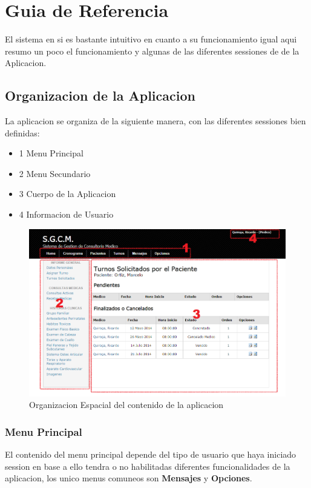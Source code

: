 \chapter{Guia de Referencia}

El sistema en si es bastante intuitivo en cuanto a su funcionamiento igual aqui
resumo un poco el funcionamiento y algunas de las diferentes
sessiones de de la Aplicacion.

\section{Organizacion de la Aplicacion}

La aplicacion se organiza de la siguiente manera, con las diferentes sessiones
bien definidas:

\begin{itemize}
    \item 1 Menu Principal
    \item 2 Menu Secundario
    \item 3 Cuerpo de la Aplicacion
    \item 4 Informacion de Usuario
\end{itemize}

\begin{figure}[H]
    \centering
    \includegraphics[scale=0.5]{resourse/organizacion.png}
    \caption{Organizacion Espacial del contenido de la aplicacion}
    \label{fig:61}
\end{figure}


\subsection{Menu Principal}
El contenido del menu principal depende del tipo de usuario que haya iniciado session
en base a ello tendra o no habilitadas diferentes funcionalidades de la aplicacion,
los unico menus comuneos son \textbf{Mensajes} y \textbf{Opciones}.


